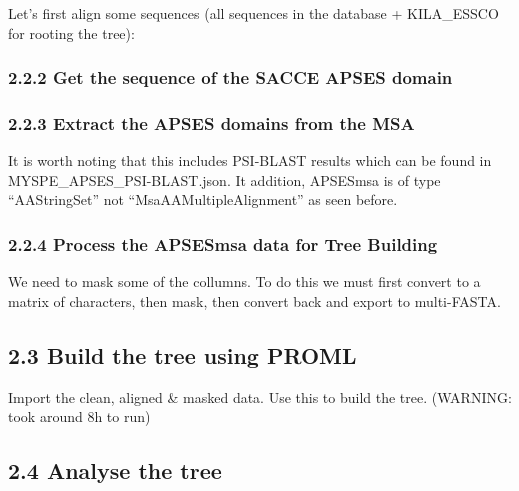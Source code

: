 \documentclass[]{article}
\begin{document}
Let's first align some sequences (all sequences in the database +
KILA\_ESSCO for rooting the tree):

\subsubsection{2.2.2 Get the sequence of the SACCE APSES
domain}\label{get-the-sequence-of-the-sacce-apses-domain}

\subsubsection{2.2.3 Extract the APSES domains from the
MSA}\label{extract-the-apses-domains-from-the-msa}

It is worth noting that this includes PSI-BLAST results which can be
found in MYSPE\_APSES\_PSI-BLAST.json. It addition, APSESmsa is of type
``AAStringSet'' not ``MsaAAMultipleAlignment'' as seen before.

\subsubsection{2.2.4 Process the APSESmsa data for Tree
Building}\label{process-the-apsesmsa-data-for-tree-building}

We need to mask some of the collumns. To do this we must first convert
to a matrix of characters, then mask, then convert back and export to
multi-FASTA.

\subsection{2.3 Build the tree using
PROML}\label{build-the-tree-using-proml}

Import the clean, aligned \& masked data. Use this to build the tree.
(WARNING: took around 8h to run)

\subsection{2.4 Analyse the tree}\label{analyse-the-tree}
\end{document}
